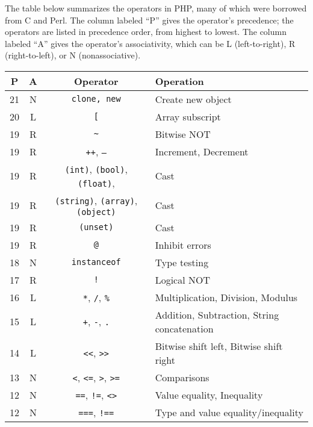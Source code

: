 \documentclass{report}
\begin{document}
\pagebreak 
{}
\bigbreak \noindent 
The table below summarizes the operators in PHP, many of which were borrowed from C and Perl. The column labeled “P” gives the operator’s precedence; the operators are listed in precedence order, from highest to lowest. The column labeled “A” gives the operator’s associativity, which can be L (left-to-right), R (right-to-left), or N (nonassociative).
\bigbreak \noindent 
\begin{table}[h!]
    \centering
    \begin{tabular}{|c|c|c|l|}
        \hline
        \textbf{P} & \textbf{A} & \textbf{Operator} & \textbf{Operation} \\ \hline
        21 & N & \texttt{clone, new} & Create new object \\ \hline
        20 & L & \texttt{[} & Array subscript \\ \hline
        19 & R & \texttt{\textasciitilde} & Bitwise NOT \\ \hline
        19 & R & \texttt{++}, \texttt{--} & Increment, Decrement \\ \hline
        19 & R & \texttt{(int)}, \texttt{(bool)}, \texttt{(float)}, & Cast \\ \hline
        19 & R & \texttt{(string)}, \texttt{(array)}, \texttt{(object)}& Cast \\ \hline
        19 & R & \texttt{(unset)} & Cast \\ \hline
        19 & R & \texttt{@} & Inhibit errors \\ \hline
        18 & N & \texttt{instanceof} & Type testing \\ \hline
        17 & R & \texttt{!} & Logical NOT \\ \hline
        16 & L & \texttt{*}, \texttt{/}, \texttt{\%} & Multiplication, Division, Modulus \\ \hline
        15 & L & \texttt{+}, \texttt{-}, \texttt{.} & Addition, Subtraction, String concatenation \\ \hline
        14 & L & \texttt{\textless\textless}, \texttt{\textgreater\textgreater} & Bitwise shift left, Bitwise shift right \\ \hline
        13 & N & \texttt{\textless}, \texttt{\textless=}, \texttt{\textgreater}, \texttt{\textgreater=} & Comparisons \\ \hline
        12 & N & \texttt{==}, \texttt{!=}, \texttt{\textless\textgreater} & Value equality, Inequality \\ \hline
        12 & N & \texttt{===}, \texttt{!==} & Type and value equality/inequality \\ \hline

\end{tabular}
\end{table}
\end{document}
